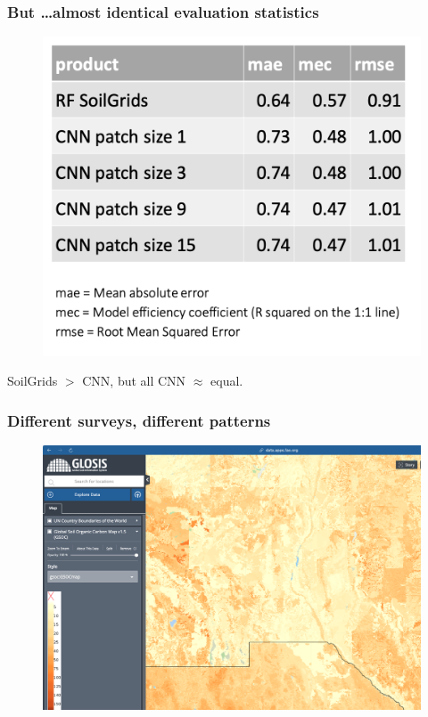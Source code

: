 \documentclass[aspectratio=169, 10pt]{beamer}
\begin{document}
\begin{frame}
  \frametitle{But \ldots almost identical evaluation statistics}
    \begin{figure}
        \centering
\includegraphics[height=0.7\textheight]{./graphics_david/Genova_poster_stats.png}
\end{figure}
SoilGrids $>$ CNN, but all CNN $\approx$ equal.
\end{frame}


\begin{frame}
  \frametitle{Different surveys, different patterns}
    \begin{figure}
        \centering
        \includegraphics[height=0.7\textheight]{./graphics_david/GLOSIS_SOC_LasCrucesRegion.png}
     \end{figure} 
\end{frame}
\end{document}
